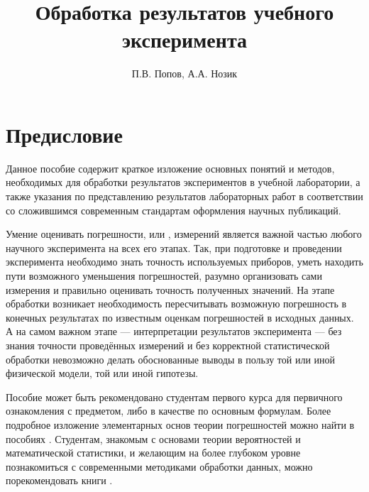 \documentclass[a5paper,10pt,oneside]{report}
\begin{document}
\title{Обработка результатов учебного эксперимента}
\author{П.В. Попов, А.А. Нозик}

\maketitle

%    



\tableofcontents


\newpage 

\chapter*{Предисловие}
    Данное пособие содержит краткое изложение основных понятий и методов, необходимых для обработки результатов экспериментов в учебной лаборатории, а также указания по представлению результатов лабораторных работ в соответствии со сложившимся современным стандартам оформления научных публикаций.

    Умение оценивать погрешности, или , измерений
    является важной частью любого научного эксперимента на всех его этапах.
    Так, при подготовке и проведении эксперимента необходимо знать точность
    используемых приборов, уметь находить пути возможного уменьшения погрешностей,
    разумно организовать сами измерения и правильно оценивать точность
    полученных значений. На этапе обработки возникает необходимость пересчитывать
    возможную погрешность в конечных результатах по известным оценкам погрешностей
    в исходных данных. А на самом важном этапе --- интерпретации
    результатов эксперимента --- без знания точности проведённых
    измерений и без корректной статистической обработки невозможно делать
    обоснованные выводы в пользу той или иной физической модели, той или
    иной гипотезы.

    Пособие может быть рекомендовано студентам первого курса для первичного
    ознакомления с предметом, либо в качестве 
    по основным формулам. Более подробное
    изложение элементарных основ теории погрешностей можно найти в пособиях \cite{taylor,squires,zaidel}. 
    Студентам, знакомым с основами теории вероятностей и математической 
    статистики, и желающим на более глубоком уровне познакомиться с современными методиками обработки данных, можно порекомендовать книги \cite{hudson,idie}.
    
\end{document}
